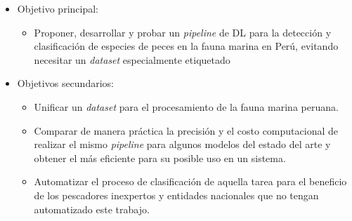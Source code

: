 \begin{itemize}
    \item { Objetivo principal: 
        \begin{itemize}
            \item Proponer, desarrollar y probar un \textit{pipeline} de DL para la detección y clasificación de especies de peces en la fauna marina en Perú, evitando necesitar un \textit{dataset} especialmente etiquetado
        \end{itemize}
     }
     \item { Objetivos secundarios:
        \begin{itemize}
            \item Unificar un \textit{dataset} para el procesamiento de la fauna marina peruana.
            \item Comparar de manera práctica la precisión y el costo computacional de realizar el mismo \textit{pipeline} para algunos modelos del estado del arte y obtener el más eficiente para su posible uso en un sistema. 
            \item Automatizar el proceso de clasificación de aquella tarea para el beneficio de los pescadores inexpertos y entidades nacionales que no tengan automatizado este trabajo.  
        \end{itemize}
        }
\end{itemize}